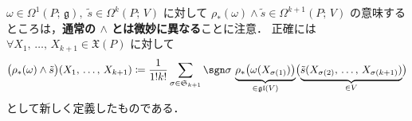 \documentclass[geometry_main]{subfiles}
\begin{document}
\begin{marker}
    $\omega \in \Omega^1(P;\, \mathfrak{g}),\; \tilde{s} \in \Omega^k(P;\, V)$ に対して $\rho_*(\omega) \wedge \tilde{s} \in \Omega^{k+1}(P;\, V)$ の意味するところは，\textbf{通常の $\bm{\wedge}$ とは微妙に異なる}ことに注意．
    正確には $\forall X_1,\, \dots,\, X_{k+1} \in \mathfrak{X}(P)$ に対して
    \begin{align}
        \bigl(\rho_*(\omega) \wedge \tilde{s} \bigr)(X_1,\, \dots,\, X_{k+1})
        \coloneqq \frac{1}{1!k!} \sum_{\sigma \in \mathfrak{S}_{k+1}} \sgn \sigma \, \underbrace{\rho_*\bigl(\omega(X_{\sigma(1)})\bigr)}_{\in \mathfrak{gl}(V)} \bigl( \underbrace{\tilde{s}(X_{\sigma(2)},\, \dots,\, X_{\sigma(k+1)})}_{\in V} \bigr) 
    \end{align}
    として新しく定義したものである．
\end{marker}
\end{document}
